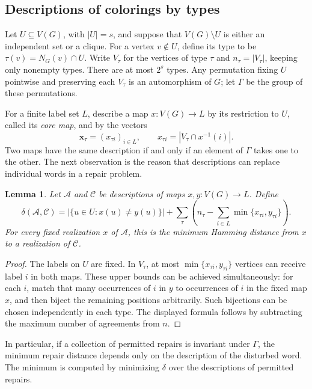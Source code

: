 \documentclass[10pt,a4paper]{amsart}
\numberwithin{equation}{section}
\newtheorem{lemma}[theorem]{Lemma}
\theoremstyle{definition}
\theoremstyle{remark}
\begin{document}
\subsection{Descriptions of colorings by types}\label{rec:types}

Let $U\subseteq V(G)$, with $|U|=s$, and suppose that
$V(G)\setminus U$ is either an independent set or a clique.
For a vertex $v\notin U$, define its type to be
$\tau(v)=N_G(v)\cap U$. Write $V_\tau$ for the vertices of type
$\tau$ and $n_\tau=|V_\tau|$, keeping only nonempty types.
There are at most $2^s$ types. Any permutation fixing $U$ pointwise
and preserving each $V_\tau$ is an automorphism of $G$; let $\Gamma$
be the group of these permutations.

For a finite label set $L$, describe a map $x:V(G)\to L$ by its
restriction to $U$, called its \emph{core map}, and by the vectors
\[
\mathbf x_\tau=(x_{\tau i})_{i\in L},\qquad
x_{\tau i}=|V_\tau\cap x^{-1}(i)|.
\]
Two maps have the same description if and only if an element of
$\Gamma$ takes one to the other. The next observation is the reason
that descriptions can replace individual words in a repair problem.

\begin{lemma}\label{rec:distance}
Let $\mathcal A$ and $\mathcal C$ be descriptions of maps $x,y:V(G)\to L$.
Define
\[
\delta(\mathcal A,\mathcal C)
=|\{u\in U:x(u)\neq y(u)\}|
+\sum_\tau\left(n_\tau-\sum_{i\in L}
\min\{x_{\tau i},y_{\tau i}\}\right).
\]
For every fixed realization $x$ of $\mathcal A$, this is the minimum
Hamming distance from $x$ to a realization of $\mathcal C$.
\end{lemma}
\begin{proof}
The labels on $U$ are fixed. In $V_\tau$, at most
$\min\{x_{\tau i},y_{\tau i}\}$ vertices can receive label $i$ in
both maps. These upper bounds can be achieved simultaneously: for
each $i$, match that many occurrences of $i$ in $y$ to occurrences
of $i$ in the fixed map $x$, and then biject the remaining positions
arbitrarily. Such bijections can be chosen independently in each
type. The displayed formula follows by subtracting the maximum
number of agreements from $n$.
\end{proof}

In particular, if a collection of permitted repairs is invariant
under $\Gamma$, the minimum repair distance depends only on the
description of the disturbed word. The minimum is computed by
minimizing $\delta$ over the descriptions of permitted repairs.
\end{document}
